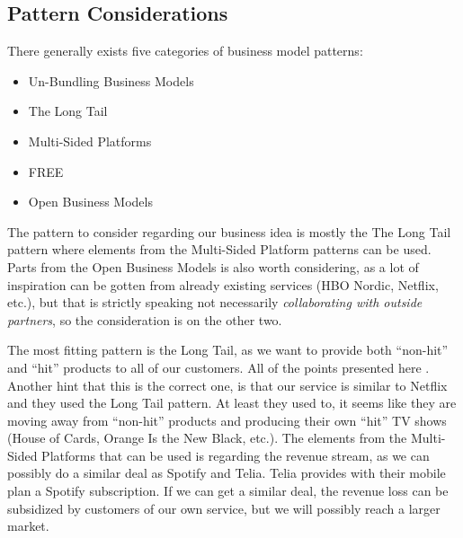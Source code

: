 \subsection{Pattern Considerations}
There generally exists five categories of business model patterns\cite{52}:
\begin{itemize}
\item Un-Bundling Business Models
\item The Long Tail
\item Multi-Sided Platforms
\item FREE
\item Open Business Models
\end{itemize}

The pattern to consider regarding our business idea is mostly the The Long Tail pattern where elements from the Multi-Sided Platform patterns can be used. Parts from the Open Business Models is also worth considering, as a lot of inspiration can be gotten from already existing services (HBO Nordic, Netflix, etc.), but that is strictly speaking not necessarily \emph{collaborating with outside partners}\cite{109}, so the consideration is on the other two.

The most fitting pattern is the Long Tail, as we want to provide both ``non-hit'' and ``hit'' products to all of our customers. All of the points presented here \cite{75}. Another hint that this is the correct one, is that our service is similar to Netflix and they used the Long Tail pattern. At least they used to, it seems like they are moving away from ``non-hit'' products and producing their own ``hit'' TV shows (House of Cards, Orange Is the New Black, etc.). The elements from the Multi-Sided Platforms that can be used is regarding the revenue stream, as we can possibly do a similar deal as Spotify and Telia. Telia provides with their mobile plan a Spotify subscription. If we can get a similar deal, the revenue loss can be subsidized by customers of our own service, but we will possibly reach a larger market.
